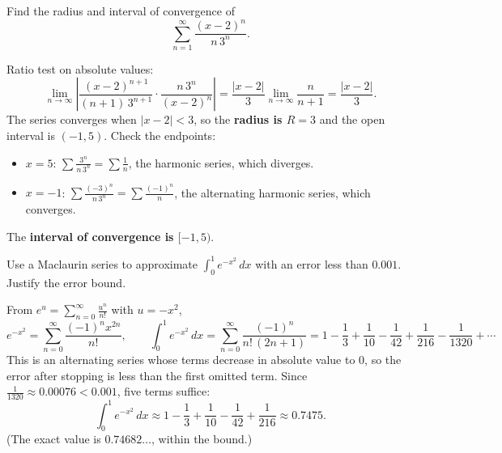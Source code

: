 \documentclass[11pt,addpoints]{exam}
\begin{document}
\begin{questions}

\question[12] Find the radius and interval of convergence of
\[
  \sum_{n=1}^\infty \frac{(x - 2)^n}{n\,3^n}.
\]

\begin{solution}
Ratio test on absolute values:
\[
  \lim_{n \to \infty} \left| \frac{(x - 2)^{n+1}}{(n+1)\,3^{n+1}} \cdot \frac{n\,3^n}{(x - 2)^n} \right| = \frac{|x - 2|}{3}\lim_{n \to \infty}\frac{n}{n + 1} = \frac{|x - 2|}{3}.
\]
The series converges when $|x - 2| < 3$, so the \textbf{radius is $R = 3$} and the open interval is $(-1, 5)$. Check the endpoints:
\begin{itemize}[nosep]
  \item $x = 5$: $\sum \frac{3^n}{n\,3^n} = \sum \frac{1}{n}$, the harmonic series, which diverges.
  \item $x = -1$: $\sum \frac{(-3)^n}{n\,3^n} = \sum \frac{(-1)^n}{n}$, the alternating harmonic series, which converges.
\end{itemize}
The \textbf{interval of convergence is $[-1, 5)$}.
\end{solution}

\question[10] Use a Maclaurin series to approximate $\displaystyle \int_0^1 e^{-x^2}\,dx$ with an error less than $0.001$. Justify the error bound.

\begin{solution}
From $e^u = \sum_{n=0}^\infty \frac{u^n}{n!}$ with $u = -x^2$,
\[
  e^{-x^2} = \sum_{n=0}^\infty \frac{(-1)^n x^{2n}}{n!},
  \qquad
  \int_0^1 e^{-x^2}\,dx = \sum_{n=0}^\infty \frac{(-1)^n}{n!\,(2n + 1)} = 1 - \frac{1}{3} + \frac{1}{10} - \frac{1}{42} + \frac{1}{216} - \frac{1}{1320} + \cdots
\]
This is an alternating series whose terms decrease in absolute value to $0$, so the error after stopping is less than the first omitted term. Since $\frac{1}{1320} \approx 0.00076 < 0.001$, five terms suffice:
\[
  \int_0^1 e^{-x^2}\,dx \approx 1 - \frac{1}{3} + \frac{1}{10} - \frac{1}{42} + \frac{1}{216} \approx 0.7475.
\]
(The exact value is $0.74682\ldots$, within the bound.)
\end{solution}


\end{questions}
\end{document}

